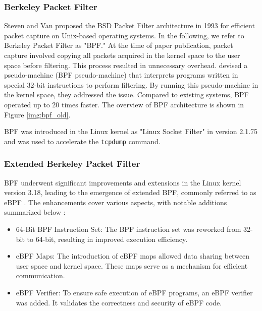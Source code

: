 \subsubsection{Berkeley Packet Filter}
Steven and Van \cite{mccanne1993bsd} proposed the BSD Packet Filter architecture in 1993 for efficient packet capture on
Unix-based operating systems. In the following, we refer to Berkeley Packet Filter as "BPF."
At the time of paper publication, packet capture involved copying all packets acquired in the kernel
space to the user space before filtering.
This process resulted in unnecessary overhead. \cite{mccanne1993bsd} devised a pseudo-machine (BPF pseudo-machine)
that interprets programs written in special 32-bit instructions to perform filtering.
By running this pseudo-machine in the kernel space, they addressed the issue. Compared to existing systems,
BPF operated up to 20 times faster.
The overview of BPF architecture is shown in Figure \ref{img:bpf_old}.

BPF was introduced in the Linux kernel as "Linux Socket Filter" in version 2.1.75 and
was used to accelerate the \texttt{tcpdump} command.

\subsubsection{Extended Berkeley Packet Filter}
BPF underwent significant improvements and extensions in the Linux kernel version 3.18,
leading to the emergence of extended BPF, commonly referred to as eBPF \cite{Linux31836:online}.
The enhancements cover various aspects, with notable additions summarized below \cite{learning-ebpf}:
\begin{itemize}
  \item 64-Bit BPF Instruction Set: The BPF instruction set was reworked from 32-bit to 64-bit, resulting in improved execution efficiency.
  \item eBPF Maps: The introduction of eBPF maps allowed data sharing between user space and kernel space. These maps serve as a mechanism for efficient communication.
  \item eBPF Verifier: To ensure safe execution of eBPF programs, an eBPF verifier was added. It validates the correctness and security of eBPF code.
\end{itemize}


